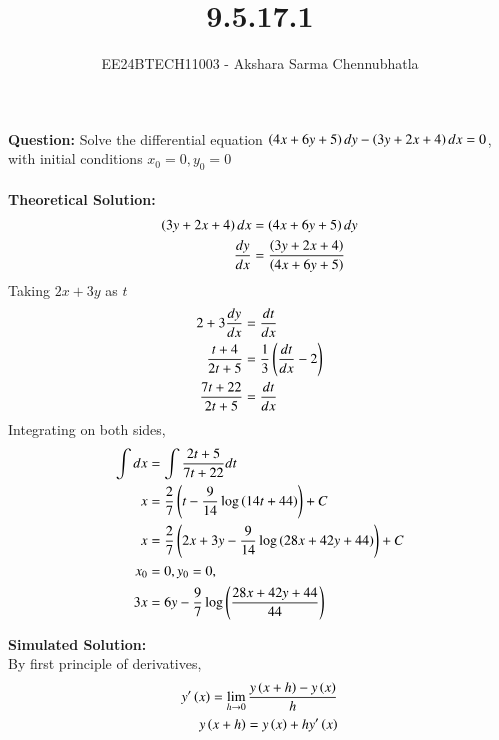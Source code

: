 \documentclass[journal]{IEEEtran}
\begin{document}

\vspace{3cm}

\title{9.5.17.1}
\author{EE24BTECH11003 - Akshara Sarma Chennubhatla}
{\let\newpage\relax\maketitle}
\textbf{Question:}
Solve the differential equation $\left(4x + 6y + 5\right)dy - \left(3y + 2x + 4\right)dx = 0$, with initial conditions $x_0 = 0, y_0 = 0$\\

\solution\\
\textbf{Theoretical Solution:}\\

\begin{align}
	\left(3y + 2x + 4\right)dx &= \left(4x + 6y + 5\right)dy\\
	\frac{dy}{dx} &= \frac{\left(3y + 2x + 4\right)}{\left(4x + 6y + 5\right)}\\
\end{align}
Taking $2x + 3y$ as $t$
\begin{align}
	2 + 3 \frac{dy}{dx} &= \frac{dt}{dx}\\
	\frac{t + 4}{2t + 5} &= \frac{1}{3}\left(\frac{dt}{dx} - 2\right)\\
	\frac{7t + 22}{2t + 5} &= \frac{dt}{dx}\\
\end{align}
Integrating on both sides,
\begin{align}
	\int dx &= \int \frac{2t + 5}{7t + 22}dt\\
	x &= \frac{2}{7}\left(t - \frac{9}{14}\log\left(14t + 44\right)\right) + C\\
	x &= \frac{2}{7}\left(2x + 3y - \frac{9}{14}\log\left(28x + 42y + 44\right)\right) + C\\
	x_0 &= 0, y_0 = 0,\\
	3x &= 6y - \frac{9}{7}\log\left(\frac{28x + 42y + 44}{44}\right)\\
\end{align}

\textbf{Simulated Solution:}\\

By first principle of derivatives,
\begin{align}
	y^{\prime}\left(x\right) = \lim_{h\to 0}\frac{y\left(x+h\right) - y\left(x\right)}{h}\\
	y\left(x+h\right) = y\left(x\right) + hy^{\prime}\left(x\right)
\end{align}
\end{document}
